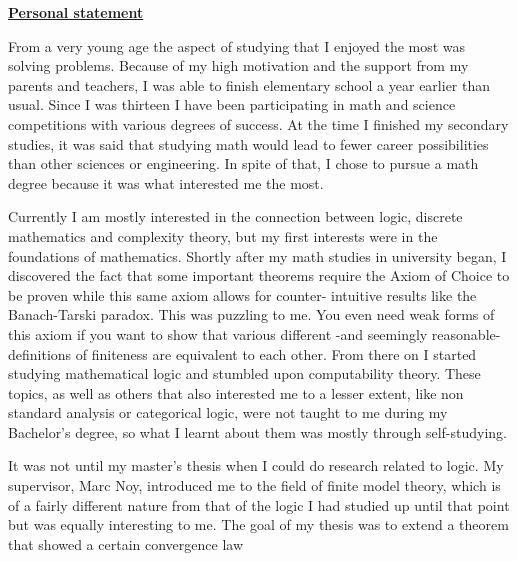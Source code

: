 \documentclass{article}
\begin{document}
\begin{large}
\underline{\textbf{Personal statement}}
\end{large}

\bigskip





From a very young age the aspect of studying that 
I enjoyed the most was solving problems. Because 
of my high motivation and the support from my parents
and teachers, I was able to finish elementary school a 
year earlier than usual. Since I was thirteen
I have been participating in math and science competitions with
various degrees of success. At the time I finished my 
secondary studies, it was said that 
studying math would lead to fewer career possibilities
than other sciences or engineering. In spite of that,
I chose to pursue a math degree because it was what 
interested me the most. \par

Currently I am mostly interested in the connection between
logic, discrete mathematics and complexity theory, but my 
first interests were in the foundations of mathematics. 
Shortly after my math studies in university began, I discovered
the fact that some important theorems require the Axiom 
of Choice to be proven while this same axiom allows for counter-
intuitive results like the Banach-Tarski paradox. This was puzzling 
to me. You even need weak forms of this axiom if you want to show
that various different -and seemingly reasonable- definitions of 
finiteness are equivalent to each other. From there on I started 
studying mathematical logic and stumbled upon computability 
theory. These topics, as well as others that also interested me 
to a lesser extent, like non standard analysis or categorical logic, 
were not taught to me during my Bachelor's degree, so what I learnt 
about them was mostly through self-studying. \par
It was not until my master's thesis when I could do research related
to logic. My supervisor, Marc Noy, introduced me to the field of finite
model theory, which is of a fairly different nature from that of the logic 
I had studied up until that point but was equally interesting to me. 
The goal of my thesis was to extend a theorem that showed a certain 
convergence law  








%
%
\end{document}
